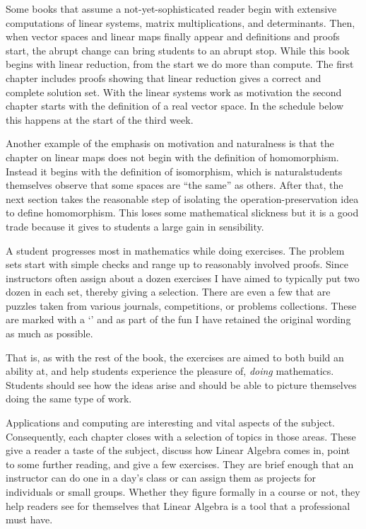 {Some books that assume a not-yet-sophisticated reader
begin with extensive computations of linear systems, 
matrix multiplications, 
and determinants.
Then, when 
vector spaces and linear maps finally appear
and definitions and proofs start, the abrupt change
can bring students to an abrupt stop.
While this book begins with
linear reduction, from the start
we do more than compute.
The first chapter
includes proofs showing that linear reduction gives a correct and
complete solution set.
With the linear systems work as motivation
the second chapter starts with the definition of a real vector space.
In the schedule below this happens at the start of the third week.

Another example of the emphasis on motivation and naturalness
is that the chapter on linear maps
does not begin with the definition of homomorphism.
Instead it begins with the definition of isomorphism, which
is natural\Dash students themselves
observe that some spaces are ``the same'' as others.
After that,
the next section takes the reasonable step of 
isolating the operation-preservation idea
to define homomorphism.
This loses some mathematical slickness 
but it is a good trade because it gives to students
a large gain in sensibility.

A student progresses most in mathematics while doing exercises. 
The problem sets start with 
simple checks and range up to reasonably involved proofs.
Since instructors often assign about a dozen exercises
I have aimed to typically put two dozen in each set, 
thereby giving a selection.
There are even a few that are puzzles
taken from various journals, competitions, or
problems collections. 
These are marked with a
`\puzzlemark' and 
as part of the fun I have retained the original wording
as much as possible.

That is, as with the rest of the book, 
the exercises are aimed to both build an ability at,
and help students experience the pleasure of, 
\emph{doing} mathematics.
Students should see how the ideas arise and should be able to 
picture themselves doing the same type of work.


\medskip
{}
Applications and computing are interesting and vital aspects 
of the subject.
Consequently, each chapter closes with a selection of
topics in those areas.
These give a reader
a taste of the subject, discuss how Linear Algebra comes in,
point to some further reading, and give a few exercises. 
They are brief enough that an instructor can do one
in a day's class 
or can assign them as projects for individuals or small groups.
Whether they figure formally in a course or not, they help
readers see for themselves that Linear Algebra is a tool
that a professional must have. 




}
